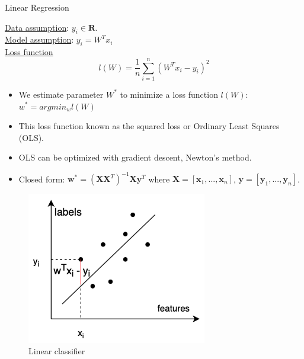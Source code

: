 \documentclass[aspectratio=1610]{beamer}
\begin{document}
\begin{frame}{Linear Regression}
\begin{minipage}{0.55\textwidth}
\underline{Data assumption}: $y_i\in \textbf{R}$.\\
\underline{Model assumption}: $y_i = W^Tx_i$\\
\underline{Loss function}
$$l(W) = \frac{1}{n}\sum_{i=1}^{n}(W^Tx_i-y_i)^2$$
\begin{itemize}
    \item We estimate parameter $W^*$ to minimize a loss function $l(W)$: $w^* = argmin_w l(W)$
    \item This loss function known as the squared loss or Ordinary Least Squares (OLS).
    \item OLS can be optimized with gradient descent, Newton's method.
    \item Closed form: $\textbf{w}^* = (\textbf{XX}^T)^{-1}\textbf{X}\textbf{y}^T$ where $\textbf{X} = [\textbf{x}_1,...,\textbf{x}_n]$, $\textbf{y} = [\textbf{y}_1,...,\textbf{y}_n]$.
\end{itemize} 

\end{minipage}
\begin{minipage}{0.4\textwidth}

    \begin{figure}[h!]
  \includegraphics[width=0.7\textwidth]{Screen Shot 2022-05-21 at 17.19.06.png}
  \caption{Linear classifier}
\end{figure}
\end{minipage}
\end{frame}
\end{document}
